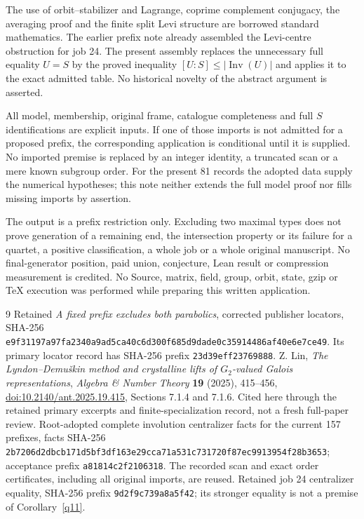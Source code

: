 \documentclass[11pt]{article}
\theoremstyle{remark}\newtheorem{remark}[lemma]{Remark}
\newcommand{\Inv}{\operatorname{Inv}}
\begin{document}
The use of orbit--stabilizer and Lagrange, coprime complement conjugacy,
the averaging proof and the finite split Levi structure are borrowed
standard mathematics. The earlier prefix note already assembled the
Levi-centre obstruction for job 24. The present assembly replaces the
unnecessary full equality $U=S$ by the proved inequality
$[U:S]\leq |\Inv(U)|$ and applies it to the exact admitted table.
No historical novelty of the abstract argument is asserted.

All model, membership, original frame, catalogue completeness and full
$S$ identifications are explicit inputs. If one of those imports is
not admitted for a proposed prefix, the corresponding application is
conditional until it is supplied. No imported premise is replaced by
an integer identity, a truncated scan or a mere known subgroup order.
For the present 81 records the adopted data supply the numerical
hypotheses; this note neither extends the full model proof nor fills
missing imports by assertion.

The output is a prefix restriction only. Excluding two maximal types
does not prove generation of a remaining end, the intersection property
or its failure for a quartet, a positive classification, a whole job or
a whole original manuscript. No final-generator position, paid union,
conjecture, Lean result or compression measurement is credited.
No Source, matrix, field, group, orbit, state, gzip or TeX execution
was performed while preparing this written application.

\begin{thebibliography}{9}
Retained \emph{A fixed prefix excludes both parabolics}, corrected
publisher locators, SHA-256
\texttt{e9f31197a97fa2340a9ad5ca40c6d300f685d9dade0c35914486af40e6e7ce49}.
Its primary locator record has SHA-256 prefix \texttt{23d39eff23769888}.
Z. Lin, \emph{The Lyndon--Demu\v{s}kin method and crystalline lifts of
$G_2$-valued Galois representations}, \emph{Algebra \& Number Theory}
\textbf{19} (2025), 415--456,
\href{https://doi.org/10.2140/ant.2025.19.415}{doi:10.2140/ant.2025.19.415},
Sections 7.1.4 and 7.1.6. Cited here through the retained primary
excerpts and finite-specialization record, not a fresh full-paper review.
Root-adopted complete involution centralizer facts for the current 157
prefixes, facts SHA-256
\texttt{2b7206d2dbcb171d5bf3df163e29cca71a531c731720f87ec9913954f28b3653};
acceptance prefix \texttt{a81814c2f2106318}. The recorded scan and exact
order certificates, including all original imports, are reused.
Retained job 24 centralizer equality, SHA-256 prefix
\texttt{9d2f9c739a8a5f42}; its stronger equality is not a premise of
Corollary~\ref{q11}.
\end{thebibliography}
\end{document}
